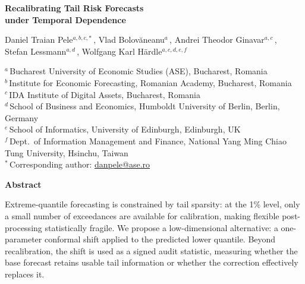 \documentclass[11pt]{article}
\begin{document}
\begin{center}

\vspace*{0.1cm}

{\LARGE\bfseries Recalibrating Tail Risk Forecasts\\[4pt]
under Temporal Dependence}

\vspace{0.4cm}

{\large
Daniel Traian Pele$^{a,b,c,*}$\,,\quad
Vlad Bolov\u{a}neanu$^{a}$\,,\quad
Andrei Theodor Ginavar$^{a,c}$\,,\\[4pt]
Stefan Lessmann$^{a,d}$\,,\quad
Wolfgang Karl H{\"a}rdle$^{a,c,d,e,f}$
}

\vspace{0.25cm}

\begin{flushleft}
\small
$^{a}$\,Bucharest University of Economic Studies (ASE), Bucharest, Romania\\[1pt]
$^{b}$\,Institute for Economic Forecasting, Romanian Academy, Bucharest, Romania\\[1pt]
$^{c}$\,IDA Institute of Digital Assets, Bucharest, Romania\\[1pt]
$^{d}$\,School of Business and Economics, Humboldt University of Berlin, Berlin, Germany\\[1pt]
$^{e}$\,School of Informatics, University of Edinburgh, Edinburgh, UK\\[1pt]
$^{f}$\,Dept.\ of Information Management and Finance, National Yang Ming Chiao Tung University, Hsinchu, Taiwan\\[4pt]
$^{*}$\,Corresponding author: \href{mailto:danpele@ase.ro}{danpele@ase.ro}
\end{flushleft}

\end{center}

\vspace{0.15cm}

\noindent\textbf{Abstract}

\smallskip

\noindent
Extreme-quantile forecasting is constrained by tail sparsity: at the 1\% level, only a small number of exceedances are available for calibration, making flexible post-processing statistically fragile. We propose a low-dimensional alternative: a one-parameter conformal shift applied to the predicted lower quantile. Beyond recalibration, the shift is used as a signed audit statistic, measuring whether the base forecast retains usable tail information or whether the correction effectively replaces it.
\end{document}
